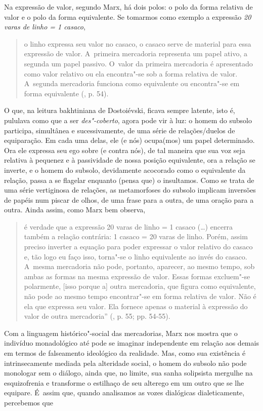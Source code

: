 Na expressão de valor, segundo Marx, há dois polos: o polo da forma
relativa de valor e o polo da forma equivalente. Se tomarmos como
exemplo a expressão \emph{20 varas de linho = 1 casaco},

\begin{quote}
o linho expressa seu valor no casaco, o casaco serve de material para
essa expressão de valor. A~primeira mercadoria representa um papel
ativo, a segunda um papel passivo. O~valor da primeira mercadoria é
apresentado como valor relativo ou ela encontra"-se sob a forma relativa
de valor. A~segunda mercadoria funciona como equivalente ou encontra"-se
em forma equivalente (, p. 54).
\end{quote}

O que, na leitura bakhtiniana de Dostoiévski, ficava sempre latente,
isto é, pululava como que a ser \emph{des"-coberto}, agora pode vir à
luz: o homem do subsolo participa, simultânea e sucessivamente, de uma
série de relações/duelos de equiparação. Em cada uma delas, ele (e nós)
ocupa(mos) um papel determinado. Ora ele expressa seu ego sobre (e
contra nós), de tal maneira que sua voz seja relativa à pequenez e à
passividade de nossa posição equivalente, ora a relação se inverte, e o
homem do subsolo, devidamente acocorado como o equivalente da relação,
passa a se flagelar enquanto (pensa que) o insultamos. Como se trata de
uma série vertiginosa de relações, as metamorfoses do subsolo implicam
inversões de papéis num piscar de olhos, de uma frase para a outra, de
uma oração para a outra. Ainda assim, como Marx bem observa,

\begin{quote}
é verdade que a expressão 20 varas de linho = 1 casaco (\ldots) encerra
também a relação contrária: 1 casaco = 20 varas de linho. Porém, assim
preciso inverter a equação para poder expressar o valor relativo do
casaco e, tão logo eu faço isso, torna"-se o linho equivalente ao invés
do casaco. A~mesma mercadoria não pode, portanto, aparecer, ao mesmo
tempo, sob ambas as formas na mesma expressão de valor. Essas formas
excluem"-se polarmente, {[}isso porque a{]} outra mercadoria, que figura
como equivalente, não pode ao mesmo tempo encontrar"-se em forma relativa
de valor. Não é ela que expressa seu valor. Ela fornece apenas o
material à expressão do valor de outra mercadoria'' (, p. 55; pp.
54-55).
\end{quote}

Com a linguagem histórico"-social das mercadorias, Marx nos mostra que o
indivíduo monadológico até pode se imaginar independente em relação aos
demais em termos de falseamento ideológico da realidade. Mas, como sua
existência é intrinsecamente mediada pela alteridade social, o homem do
subsolo não pode monologar sem o diálogo, ainda que, no limite, sua
sanha solipsista mergulhe na esquizofrenia e transforme o estilhaço de
seu alterego em um outro que se lhe equipare. É~assim que, quando
analisamos as vozes dialógicas dialeticamente, percebemos que

